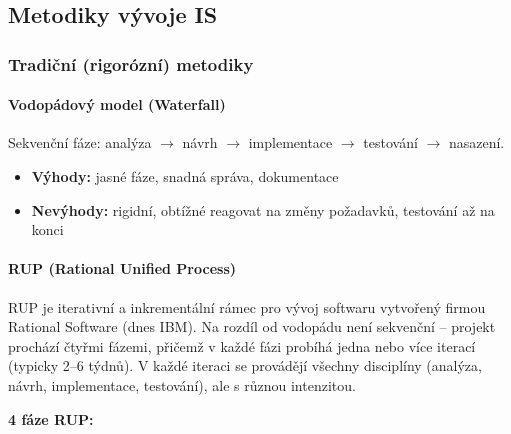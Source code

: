 \subsection{Metodiky vývoje IS}

\subsubsection{Tradiční (rigorózní) metodiky}

\paragraph{Vodopádový model (Waterfall)}
Sekvenční fáze: analýza $\to$ návrh $\to$ implementace $\to$ testování $\to$ nasazení.
\begin{itemize}
  \item \textbf{Výhody:} jasné fáze, snadná správa, dokumentace
  \item \textbf{Nevýhody:} rigidní, obtížné reagovat na změny požadavků, testování až na konci
\end{itemize}

\paragraph{RUP (Rational Unified Process)}
RUP je iterativní a inkrementální rámec pro vývoj softwaru vytvořený firmou Rational Software (dnes IBM).
Na rozdíl od vodopádu není sekvenční -- projekt prochází čtyřmi fázemi, přičemž v každé fázi probíhá
jedna nebo více iterací (typicky 2--6 týdnů). V každé iteraci se provádějí všechny disciplíny
(analýza, návrh, implementace, testování), ale s různou intenzitou.

\textbf{4 fáze RUP:}

